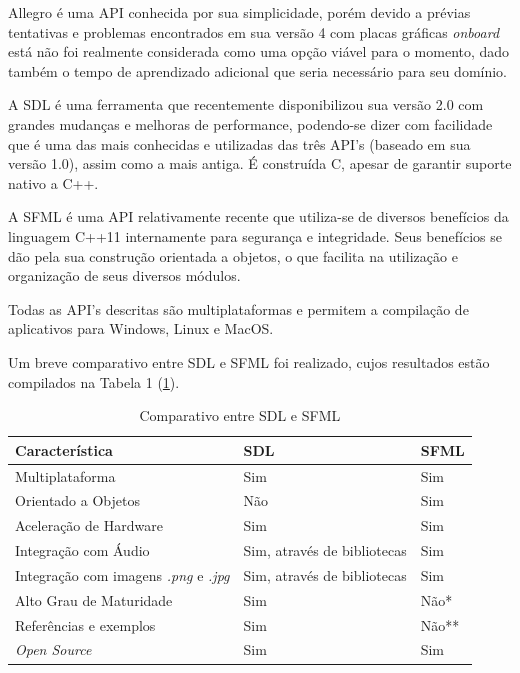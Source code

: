 Allegro é uma API conhecida por sua simplicidade, porém devido a prévias tentativas e problemas encontrados em sua versão 4 com placas gráficas \textit{onboard} está não foi realmente considerada como uma opção viável para o momento, dado também o tempo de aprendizado adicional que seria necessário para seu domínio.

A SDL é uma ferramenta que recentemente disponibilizou sua versão 2.0 com grandes mudanças e melhoras de performance, podendo-se dizer com facilidade que é uma das mais conhecidas e utilizadas das três API's (baseado em sua versão 1.0), assim como a mais antiga. É construída C, apesar de garantir suporte nativo a C++.

A SFML é uma API relativamente recente que utiliza-se de diversos benefícios da linguagem C++11 internamente para segurança e integridade. Seus benefícios se dão pela sua construção orientada a objetos, o que facilita na utilização e organização de seus diversos módulos.

Todas as API's descritas são multiplataformas e permitem a compilação de aplicativos para Windows, Linux e MacOS.

Um breve comparativo entre SDL e SFML foi realizado, cujos resultados estão compilados na Tabela 1 (\ref{tab01}).

\begin{table}[h]
	\centering
	\label{tab01}
	
	\begin{tabular}{lll}
		\toprule
		\textbf{Característica} & \textbf{SDL} & 
		\textbf{SFML} \\
		\midrule
		Multiplataforma 			& Sim & Sim \\
		Orientado a Objetos 		& Não & Sim \\
		Aceleração de Hardware   	& Sim & Sim \\
		Integração com Áudio		& Sim, através de bibliotecas & Sim \\
		Integração com imagens \textit{.png} e \textit{.jpg} & Sim, através de bibliotecas & Sim \\
		Alto Grau de Maturidade		& Sim & Não* \\
		Referências e exemplos		& Sim & Não**\\
		\textit{Open Source}					& Sim & Sim\\
		\bottomrule
	\end{tabular}

	\caption{Comparativo entre SDL e SFML}
\end{table}

